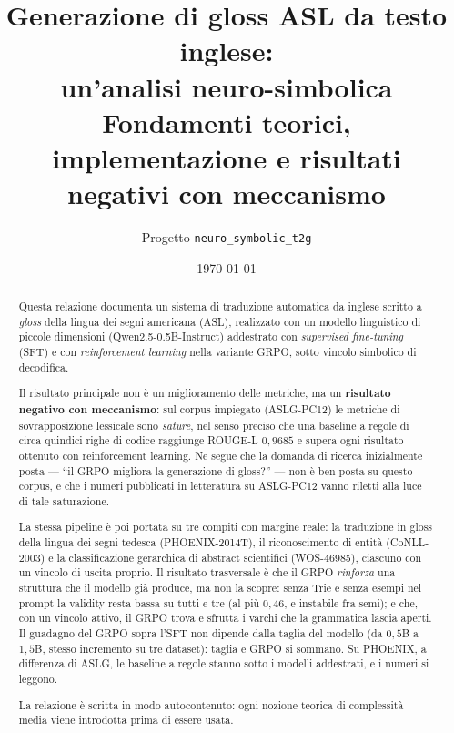 \documentclass[11pt,a4paper]{report}
\title{%
  Generazione di gloss ASL da testo inglese:\\
  un'analisi neuro-simbolica\\
  \large Fondamenti teorici, implementazione e risultati negativi con meccanismo}
\author{Progetto \texttt{neuro\_symbolic\_t2g}}
\date{\today}
\begin{document}
\maketitle

\begin{abstract}
Questa relazione documenta un sistema di traduzione automatica da inglese scritto
a \emph{gloss} della lingua dei segni americana (ASL), realizzato con un modello
linguistico di piccole dimensioni (Qwen2.5-0.5B-Instruct) addestrato con
\emph{supervised fine-tuning} (SFT) e con \emph{reinforcement learning} nella
variante GRPO, sotto vincolo simbolico di decodifica.

Il risultato principale non è un miglioramento delle metriche, ma un
\textbf{risultato negativo con meccanismo}: sul corpus impiegato (ASLG-PC12) le
metriche di sovrapposizione lessicale sono \emph{sature}, nel senso preciso che
una baseline a regole di circa quindici righe di codice raggiunge
ROUGE-L $0{,}9685$ e supera ogni risultato ottenuto con reinforcement learning.
Ne segue che la domanda di ricerca inizialmente posta --- ``il GRPO migliora la
generazione di gloss?'' --- non è ben posta su questo corpus, e che i numeri
pubblicati in letteratura su ASLG-PC12 vanno riletti alla luce di tale
saturazione.

La stessa pipeline è poi portata su tre compiti con margine reale: la
traduzione in gloss della lingua dei segni tedesca (PHOENIX-2014T), il
riconoscimento di entità (CoNLL-2003) e la classificazione gerarchica di
abstract scientifici (WOS-46985), ciascuno con un vincolo di uscita proprio.
Il risultato trasversale è che il GRPO \emph{rinforza} una struttura che il
modello già produce, ma non la scopre: senza Trie e senza esempi nel prompt la
validity resta bassa su tutti e tre (al più $0{,}46$, e instabile fra semi); e
che, con un vincolo attivo, il GRPO trova e sfrutta i varchi che la grammatica
lascia aperti. Il guadagno del GRPO sopra l'SFT non dipende dalla taglia del modello (da
$0{,}5$B a $1{,}5$B, stesso incremento su tre dataset): taglia e GRPO si sommano.
Su PHOENIX, a differenza di ASLG, le baseline a regole stanno sotto i modelli
addestrati, e i numeri si leggono.

La relazione è scritta in modo autocontenuto: ogni nozione teorica di
complessità media viene introdotta prima di essere usata.
\end{abstract}

\tableofcontents


















\end{document}
